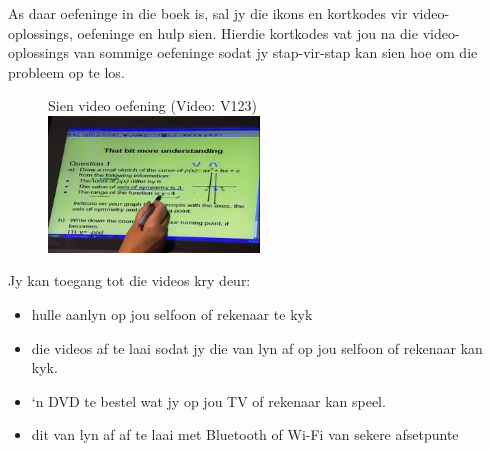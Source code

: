 {

As daar oefeninge in die boek is, sal jy die ikons en kortkodes vir video-oplossings, oefeninge en hulp sien. Hierdie kortkodes vat jou na die video-oplossings van sommige oefeninge sodat jy stap-vir-stap kan sien hoe om die probleem op te los. \par

\begin{figure}[h]
\begin{center}
Sien video oefening  (Video: V123)\\ 
\includegraphics[width=0.5\textwidth]{title_images/mindsetexercise.png}
\end{center}
\end{figure}
Jy kan toegang tot die videos kry deur:
\begin{itemize}[noitemsep]
\item hulle aanlyn op jou selfoon of rekenaar te kyk
\item die videos af te laai sodat jy die van lyn af op jou selfoon of rekenaar kan kyk.
\item ‘n DVD te bestel wat jy op jou TV of rekenaar kan speel.
\item dit van lyn af af te laai met Bluetooth of Wi-Fi van sekere afsetpunte
\end{itemize}
}


